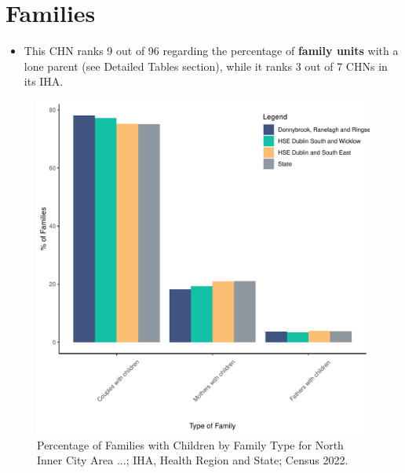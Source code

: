 \documentclass{article}
\begin{document}
\section{Families}\label{sect:Fam}
\begin{itemize}
\item This CHN ranks  9 out of 96 regarding the percentage of \textbf{family units} with a lone parent (see Detailed Tables section), while it ranks   3 out of 7 CHNs in its IHA.
\end{itemize}
\begin{figure}[H]
	\centering
	\includegraphics[width = 150mm]{../figures/FamED.pdf}
	\caption{Percentage of Families with Children by Family Type for North Inner City Area ...; IHA, Health Region and State; Census 2022.}
	\label{fig:vbnv}
	\end{figure}
	
\end{document}
